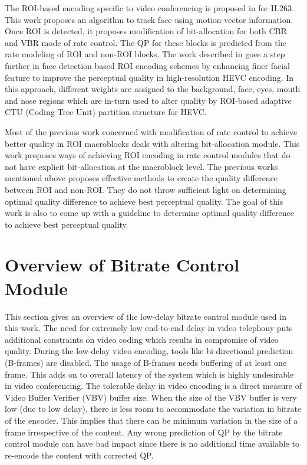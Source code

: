 \documentclass[11pt]{article} %
\begin{document}
The ROI-based encoding specific to video conferencing is proposed in \cite{ROI-MV-based-face-tracking} for H.263. This work proposes an algorithm to track face using motion-vector information. Once ROI is detected, it proposes modification of bit-allocation for both CBR and VBR mode of rate control. The QP for these blocks is predicted from the rate modeling of ROI and non-ROI blocks. The work described in \cite{Perception-model-of-face} goes a step further in face detection based ROI encoding schemes by enhancing finer facial feature to improve the perceptual quality in high-resolution HEVC encoding. In this approach, different weights are assigned to the background, face, eyes, mouth and nose regions which are in-turn used to alter quality by ROI-based adaptive CTU (Coding Tree Unit) partition structure for HEVC.

Most of the previous work concerned with modification of rate control to achieve better quality in ROI macroblocks deals with altering bit-allocation module. This work proposes ways of achieving ROI encoding in rate control modules that do not have explicit bit-allocation at the macroblock level. The previous works mentioned above proposes effective methods to create the quality difference between ROI and non-ROI. They do not throw sufficient light on determining optimal quality difference to achieve best perceptual quality. The goal of this work is also to come up with a guideline to determine optimal quality difference to achieve best perceptual quality.

\section{Overview of Bitrate Control Module} \label{used-bitrate-control-overview}
This section gives an overview of the low-delay bitrate control module used in this work. The need for extremely low end-to-end delay in video telephony puts additional constraints on video coding which results in compromise of video quality. During the low-delay video encoding, tools like bi-directional prediction (B-frames) are disabled. The usage of B-frames needs buffering of at least one frame. This adds on to overall latency of the system which is highly undesirable in video conferencing. The tolerable delay in video encoding is a direct measure of Video Buffer Verifier (VBV) buffer size. When the size of the VBV buffer is very low (due to low delay), there is less room to accommodate the variation in bitrate of the encoder. This implies that there can be minimum variation in the size of a frame irrespective of the content. Any wrong prediction of QP by the bitrate control module can have bad impact since there is no additional time available to re-encode the content with corrected QP. 
 
\end{document}
